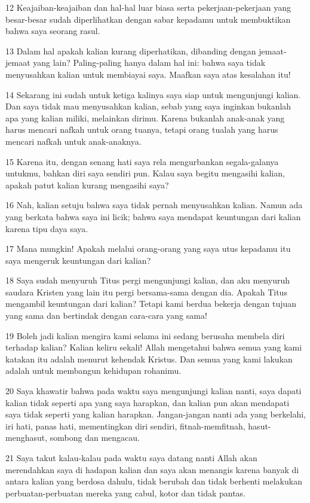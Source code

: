 \par 12 Keajaiban-keajaiban dan hal-hal luar biasa serta pekerjaan-pekerjaan yang besar-besar sudah diperlihatkan dengan sabar kepadamu untuk membuktikan bahwa saya seorang rasul.
\par 13 Dalam hal apakah kalian kurang diperhatikan, dibanding dengan jemaat-jemaat yang lain? Paling-paling hanya dalam hal ini: bahwa saya tidak menyusahkan kalian untuk membiayai saya. Maafkan saya atas kesalahan itu!
\par 14 Sekarang ini sudah untuk ketiga kalinya saya siap untuk mengunjungi kalian. Dan saya tidak mau menyusahkan kalian, sebab yang saya inginkan bukanlah apa yang kalian miliki, melainkan dirimu. Karena bukanlah anak-anak yang harus mencari nafkah untuk orang tuanya, tetapi orang tualah yang harus mencari nafkah untuk anak-anaknya.
\par 15 Karena itu, dengan senang hati saya rela mengurbankan segala-galanya untukmu, bahkan diri saya sendiri pun. Kalau saya begitu mengasihi kalian, apakah patut kalian kurang mengasihi saya?
\par 16 Nah, kalian setuju bahwa saya tidak pernah menyusahkan kalian. Namun ada yang berkata bahwa saya ini licik; bahwa saya mendapat keuntungan dari kalian karena tipu daya saya.
\par 17 Mana mungkin! Apakah melalui orang-orang yang saya utus kepadamu itu saya mengeruk keuntungan dari kalian?
\par 18 Saya sudah menyuruh Titus pergi mengunjungi kalian, dan aku menyuruh saudara Kristen yang lain itu pergi bersama-sama dengan dia. Apakah Titus mengambil keuntungan dari kalian? Tetapi kami berdua bekerja dengan tujuan yang sama dan bertindak dengan cara-cara yang sama!
\par 19 Boleh jadi kalian mengira kami selama ini sedang berusaha membela diri terhadap kalian? Kalian keliru sekali! Allah mengetahui bahwa semua yang kami katakan itu adalah menurut kehendak Kristus. Dan semua yang kami lakukan adalah untuk membangun kehidupan rohanimu.
\par 20 Saya khawatir bahwa pada waktu saya mengunjungi kalian nanti, saya dapati kalian tidak seperti apa yang saya harapkan, dan kalian pun akan mendapati saya tidak seperti yang kalian harapkan. Jangan-jangan nanti ada yang berkelahi, iri hati, panas hati, mementingkan diri sendiri, fitnah-memfitnah, hasut-menghasut, sombong dan mengacau.
\par 21 Saya takut kalau-kalau pada waktu saya datang nanti Allah akan merendahkan saya di hadapan kalian dan saya akan menangis karena banyak di antara kalian yang berdosa dahulu, tidak berubah dan tidak berhenti melakukan perbuatan-perbuatan mereka yang cabul, kotor dan tidak pantas.

